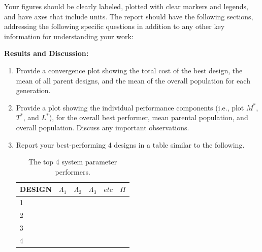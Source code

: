 \documentclass{article}
\begin{document}
 Your figures should be clearly labeled, plotted with clear markers and legends, and have axes that include units. The report should have the following sections, addressing the following specific questions in addition to any other key information for understanding your work: 
 \vspace{.1 in}


\textbf{Results and Discussion:} \begin{enumerate}


\item Provide a convergence plot showing the total cost of the best design, the mean of all parent designs, and the mean of the overall population for each generation. 


    
\item Provide a plot showing the individual performance components (i.e., plot $M^*$, $T^*$, and $L^*$), for the overall best performer, mean parental population, and overall population. Discuss any important observations.



\item{Report your best-performing 4 designs in a table similar to the following. 
\begin{table}[H]
\begin{center}
\hspace{-0.1 in} 
\begin{tabular}{l|l|l|l|l|l}\hline
  \multicolumn{1}{l|}{DESIGN}&
  \multicolumn{1}{l|}{$\Lambda_1$}&
  \multicolumn{1}{l|}{$\Lambda_2$}&
  \multicolumn{1}{l|}{$\Lambda_3$}&
  \multicolumn{1}{l|}{$etc$}&
  \multicolumn{1}{l}{$\Pi$}\\
\hline
        1     & & & & & \\
        2     & & & & & \\
        3     & & & & & \\
        4     & & & & & \\
\hline 
\end{tabular}
\caption{The top 4 system parameter performers.}\label{tab1}
\end{center}
\end{table}}


\end{enumerate}
\end{document}
